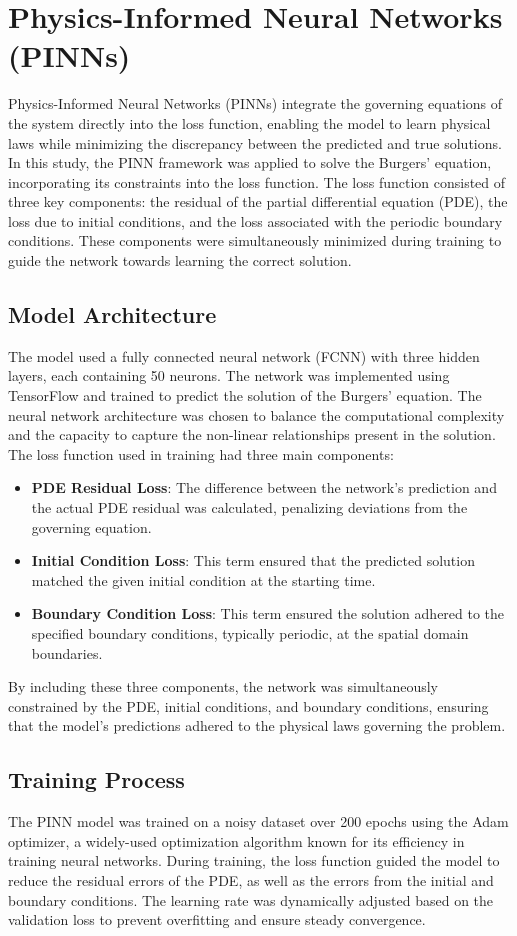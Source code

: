 \documentclass[conference]{IEEEtran}
\begin{document}
\section{Physics-Informed Neural Networks (PINNs)}
Physics-Informed Neural Networks (PINNs) integrate the governing equations of the system directly into the loss function, enabling the model to learn physical laws while minimizing the discrepancy between the predicted and true solutions. In this study, the PINN framework was applied to solve the Burgers' equation, incorporating its constraints into the loss function. The loss function consisted of three key components: the residual of the partial differential equation (PDE), the loss due to initial conditions, and the loss associated with the periodic boundary conditions. These components were simultaneously minimized during training to guide the network towards learning the correct solution.

\subsection{Model Architecture}
The model used a fully connected neural network (FCNN) with three hidden layers, each containing 50 neurons. The network was implemented using TensorFlow and trained to predict the solution of the Burgers' equation. The neural network architecture was chosen to balance the computational complexity and the capacity to capture the non-linear relationships present in the solution. The loss function used in training had three main components:
\begin{itemize}
    \item \textbf{PDE Residual Loss}: The difference between the network's prediction and the actual PDE residual was calculated, penalizing deviations from the governing equation.
    \item \textbf{Initial Condition Loss}: This term ensured that the predicted solution matched the given initial condition at the starting time.
    \item \textbf{Boundary Condition Loss}: This term ensured the solution adhered to the specified boundary conditions, typically periodic, at the spatial domain boundaries.
\end{itemize}
By including these three components, the network was simultaneously constrained by the PDE, initial conditions, and boundary conditions, ensuring that the model's predictions adhered to the physical laws governing the problem.

\subsection{Training Process}
The PINN model was trained on a noisy dataset over 200 epochs using the Adam optimizer, a widely-used optimization algorithm known for its efficiency in training neural networks. During training, the loss function guided the model to reduce the residual errors of the PDE, as well as the errors from the initial and boundary conditions. The learning rate was dynamically adjusted based on the validation loss to prevent overfitting and ensure steady convergence.
\end{document}
